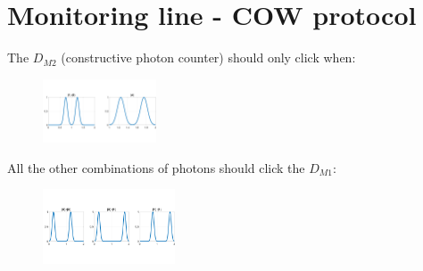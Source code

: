 \documentclass[1000pt]{article}
\newcommand{\mysection}[1]{\section*{\color{black}\sffamily #1}}%
\begin{document}

\mysection{\Huge\textbf{Monitoring line - COW protocol}} \Large \vspace*{1cm}
The $D_{M2}$ (constructive photon counter) should only click when:


  \begin{figure}[hbt]
    	\centering
    	\includegraphics[width=0.3\textwidth]{./figures/S2.pdf}
    \end{figure}

All the other combinations of photons should click the $D_{M1}$:

  \begin{figure}[hbt]
    	\centering
    	\includegraphics[width=0.35\textwidth]{./figures/S3.pdf}
    \end{figure}

\end{document}
